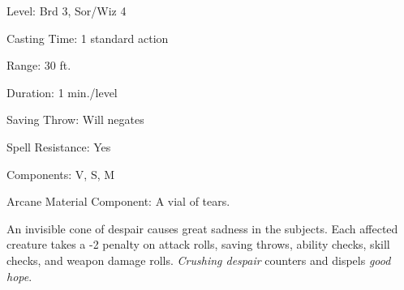 
\begin{description*}
\item[Level:] Brd 3, Sor/Wiz 4
\item[Casting Time:] 1 standard action
\item[Range:] 30 ft.
\item[Duration:] 1 min./level
\item[Saving Throw:] Will negates
\item[Spell Resistance:] Yes
\item[Components:] V, S, M
\item[Arcane Material Component:] A vial of tears.
\end{description*}

An invisible cone of despair causes great sadness in the subjects. Each affected
creature takes a -2 penalty on attack rolls, saving throws, ability checks, skill
checks, and weapon damage rolls.
\textit{Crushing despair} counters and dispels \textit{good hope}.